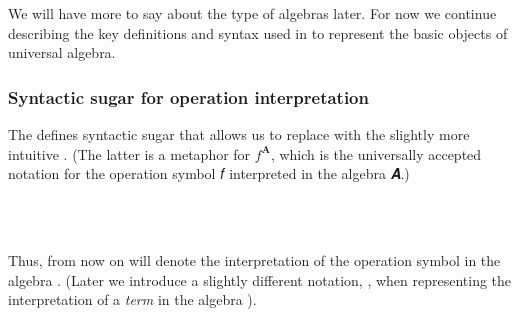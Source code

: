 \documentclass[a4paper,UKenglish,cleveref, autoref, thm-restate]{lipics-v2019}
\begin{document}
We will have more to say about the type of algebras later.  For now we continue describing the key definitions and syntax used in \agdaualib to represent the basic objects of universal algebra.

\subsubsection{Syntactic sugar for operation interpretation}
The \agdaualib defines syntactic sugar that allows us to replace \AgdaSpace{}\AgdaSpace{}\AgdaSpace{}\AgdaSpace{} with the slightly more intuitive \AgdaSpace{}\AgdaSpace{}. (The latter is a metaphor for \(f^\mathbf{A}\), which is the universally accepted notation for the operation symbol 𝑓 interpreted in the algebra 𝑨.)
\begin{code}%
\>[0][@{}l@{\AgdaIndent{0}}]%
\>[1]\AgdaSpace{}%
\AgdaSymbol{:}\AgdaSpace{}%
\AgdaSymbol{(}\AgdaSpace{}%
\AgdaSymbol{:}\AgdaSpace{}%
\AgdaSpace{}%
\AgdaSpace{}%
\AgdaSymbol{)}\AgdaSpace{}%
\AgdaSpace{}%
\AgdaSymbol{(}\AgdaSpace{}%
\AgdaSymbol{:}\AgdaSpace{}%
\AgdaSpace{}%
\AgdaSpace{}%
\AgdaSymbol{)}\AgdaSpace{}%
%
\AgdaSymbol{(}\AgdaSpace{}%
\AgdaSpace{}%
\AgdaSpace{}%
\AgdaSpace{}%
\AgdaSpace{}%
\AgdaSpace{}%
\AgdaSpace{}%
\AgdaSymbol{)}\AgdaSpace{}%
\AgdaSpace{}%
\AgdaSpace{}%
\AgdaSpace{}%
\<%
\\
%
\\[\AgdaEmptyExtraSkip]%
\>[1]\AgdaSpace{}%
\AgdaSpace{}%
\AgdaSpace{}%
\AgdaSymbol{=}\AgdaSpace{}%
\AgdaSpace{}%
\AgdaSpace{}%
\AgdaSpace{}%
\AgdaSymbol{(}\AgdaSpace{}%
\AgdaSpace{}%
\AgdaSpace{}%
\AgdaSymbol{)}\AgdaSpace{}%
\<%
\end{code}
Thus, from now on \AgdaSpace{}\AgdaSpace{}\AgdaSpace{} will denote the interpretation of the operation symbol  in the algebra .  (Later we introduce a slightly different notation, \AgdaSpace{}\AgdaSpace{}, when representing the interpretation of a \emph{term}  in the algebra ).
\end{document}
